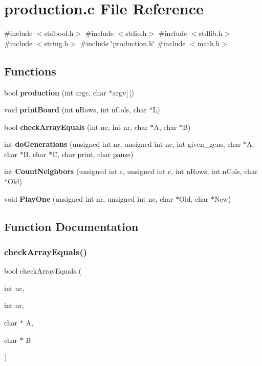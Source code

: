 \section{production.\+c File Reference}
\label{production_8c}
{\ttfamily \#include $<$stdbool.\+h$>$}\newline
{\ttfamily \#include $<$stdio.\+h$>$}\newline
{\ttfamily \#include $<$stdlib.\+h$>$}\newline
{\ttfamily \#include $<$string.\+h$>$}\newline
{\ttfamily \#include \char`\"{}production.\+h\char`\"{}}\newline
{\ttfamily \#include $<$math.\+h$>$}\newline
\subsection*{Functions}
\begin{DoxyCompactItemize}
\item 
bool \textbf{ production} (int argc, char $\ast$argv[$\,$])
\item 
void \textbf{ print\+Board} (int n\+Rows, int n\+Cols, char $\ast$L)
\item 
bool \textbf{ check\+Array\+Equals} (int nc, int nr, char $\ast$A, char $\ast$B)
\item 
int \textbf{ do\+Generations} (unsigned int nr, unsigned int nc, int given\+\_\+gens, char $\ast$A, char $\ast$B, char $\ast$C, char print, char pause)
\item 
int \textbf{ Count\+Neighbors} (unsigned int r, unsigned int c, int n\+Rows, int n\+Cols, char $\ast$Old)
\item 
void \textbf{ Play\+One} (unsigned int nr, unsigned int nc, char $\ast$Old, char $\ast$New)
\end{DoxyCompactItemize}


\subsection{Function Documentation}
\mbox{\label{production_8c_a23e42c62bb30abbf3f9280d24059cdbf}} 
\subsubsection{check\+Array\+Equals()}
{\footnotesize\ttfamily bool check\+Array\+Equals (\begin{DoxyParamCaption}\item[{int}]{nc,  }\item[{int}]{nr,  }\item[{char $\ast$}]{A,  }\item[{char $\ast$}]{B }\end{DoxyParamCaption})}

